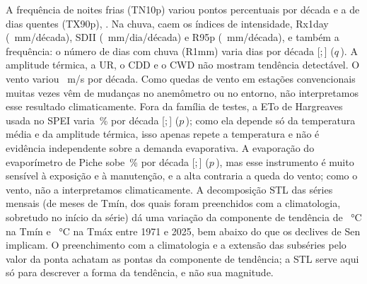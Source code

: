 \documentclass[11pt,a4paper]{article}
\newcommand{\IC}[2]{[#1;\,#2]}            %
\begin{document}
A frequência de noites frias (TN10p) variou \SenTNumzerop{} pontos percentuais por década e a de dias
quentes (TX90p), \SenTXnovezerop{}. Na chuva, caem os índices de intensidade, Rx1day
(\SenRxumday{}~mm/década), SDII (\SenSDII{}~mm/dia/década) e R95p (\SenRnovecincop{}~mm/década), e
também a frequência: o número de dias com chuva (R1mm) varia \SenRummm{} dias por década
\IC{\SenRummmICinf}{\SenRummmICsup} ($q$\,\QTFPWRummm). A amplitude térmica, a UR, o CDD e o CWD não
mostram tendência detectável. O vento variou \SenVento{}~m/s por década. Como quedas de vento em
estações convencionais muitas vezes vêm de mudanças no anemômetro ou no entorno, não interpretamos esse
resultado climaticamente. Fora da família de testes, a ETo de Hargreaves usada no SPEI varia
\SenEToPct{}\,\% por década \IC{\SenEToPctICinf}{\SenEToPctICsup} ($p$\,\PTFPWETo); como ela depende só da
temperatura média e da amplitude térmica, isso apenas repete a temperatura e não é evidência
independente sobre a demanda evaporativa. A evaporação do evaporímetro de Piche sobe \SenPichePct{}\,\%
por década \IC{\SenPichePctICinf}{\SenPichePctICsup} ($p$\,\PTFPWPiche), mas esse instrumento é muito
sensível à exposição e à manutenção, e a alta contraria a queda do vento; como o vento, não a
interpretamos climaticamente. A decomposição STL das séries mensais (de \STLMesesTmin{} meses de Tmín,
dos quais \STLPreenchTmin{} foram preenchidos com a climatologia, sobretudo no início da série) dá uma
variação da componente de tendência de \STLDeltaTmin{}~°C na Tmín e \STLDeltaTmax{}~°C na Tmáx entre 1971
e 2025, bem abaixo do que os declives de Sen implicam. O preenchimento com a climatologia e a extensão
das subséries pelo valor da ponta achatam as pontas da componente de tendência; a STL serve aqui só
para descrever a forma da tendência, e não sua magnitude.
\end{document}
